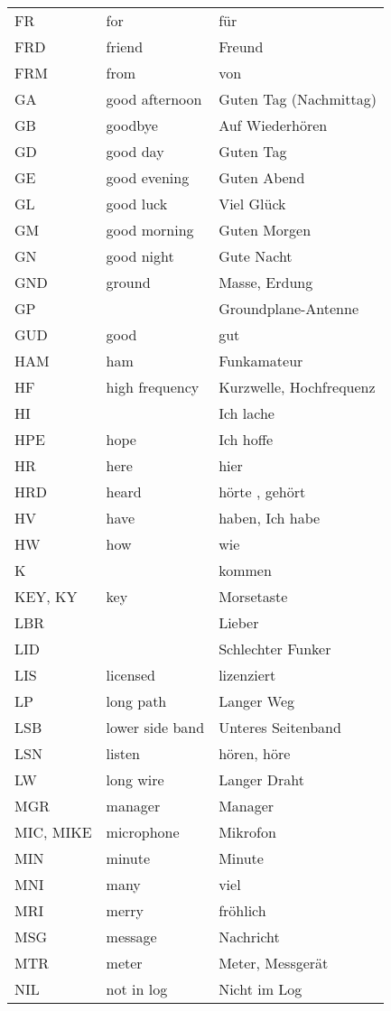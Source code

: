 {\begin{xtabular}{lll}
FR & for & für \\
FRD & friend & Freund \\
FRM & from & von \\
GA & good afternoon & Guten Tag (Nachmittag) \\
GB & goodbye & Auf Wiederhören \\
GD & good day & Guten Tag \\
GE & good evening & Guten Abend \\
GL & good luck & Viel Glück \\
GM & good morning & Guten Morgen \\
GN & good night & Gute Nacht \\
GND & ground & Masse, Erdung \\
GP &  & Groundplane-Antenne \\
GUD & good & gut \\
HAM & ham & Funkamateur \\
HF & high frequency & Kurzwelle, Hochfrequenz \\
HI &  & Ich lache \\
HPE & hope & Ich hoffe \\
HR & here & hier \\
HRD & heard & hörte , gehört \\
HV & have & haben, Ich habe \\
HW & how & wie \\
K &  & kommen \\
KEY, KY & key & Morsetaste \\
LBR &  & Lieber \\
LID &  & Schlechter Funker \\
LIS & licensed & lizenziert \\
LP & long path & Langer Weg \\
LSB & lower side band & Unteres Seitenband \\
LSN & listen & hören, höre \\
LW & long wire & Langer Draht \\
MGR & manager & Manager \\
MIC, MIKE & microphone & Mikrofon \\
MIN & minute & Minute \\
MNI & many & viel \\
MRI & merry & fröhlich \\
MSG & message & Nachricht \\
MTR & meter & Meter, Messgerät \\
NIL & not in log & Nicht im Log \\

\end{xtabular}}
